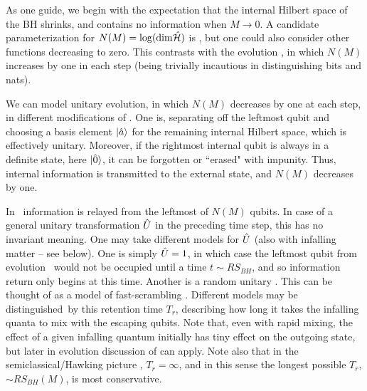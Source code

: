 As one guide, we begin with the expectation that the internal Hilbert space of the BH shrinks, and contains no information when $M\rightarrow0$. A candidate parameterization for $N(M) = \log({\rm dim} {\hat{\cal H}})$ is  \ndof, but one could also consider other functions decreasing to zero.  This contrasts with the evolution \paircreate, in which $N(M)$ increases by one in each step (being trivially incautious in distinguishing bits and nats).

We can model unitary evolution, in which $N(M)$ decreases by one at each step, in different modifications of \paircreate. One is, separating off the leftmost qubit and choosing a basis element $|{\hat a}\rangle$ for the remaining internal Hilbert space,
%
\eqn{}
%
which is effectively unitary. Moreover, if the rightmost internal qubit is always in a definite state, here $|{\hat 0}\rangle$, it can be forgotten or ``erased" with impunity.  Thus, internal information is transmitted to the external state, and $N(M)$ decreases by one.   

In \evolone\ information is relayed from the leftmost of $N(M)$ qubits.  In case of a general unitary transformation ${\hat U}$ in the preceding time step, this has no invariant meaning.  One may take different models for ${\hat U}$ (also with infalling matter -- see below).  One is simply ${\hat U}=1$, in which case the leftmost qubit from evolution \paircreate\ would not be occupied until a time $t\sim R S_{BH}$, and so information return only begins at this time.  Another is a random unitary .  This can be thought of as a model of fast-scrambling .  Different models may be distinguished\NLvC\ by this retention time $T_r$, describing how long it takes the infalling quanta to mix with the escaping qubits.  Note that, even with rapid mixing, the effect of a given infalling quantum initially has tiny effect on the outgoing state, but later in evolution discussion of   can apply.
Note also that in the semiclassical/Hawking picture \paircreate, $T_r=\infty$, and in this sense the longest possible  $T_r$, $\sim R S_{BH}(M)$, is most conservative.


